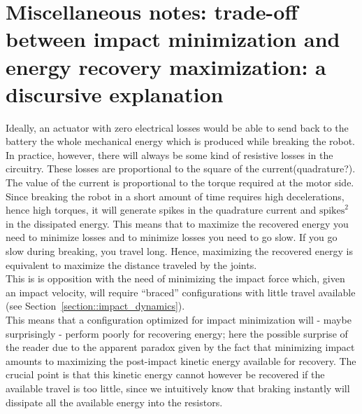 \documentclass[letterpaper, 10 pt, conference]{ieeeconf}  %
\begin{document}
\section{Miscellaneous notes: trade-off between impact minimization and energy recovery maximization: a discursive explanation}\label{section::impact_vs_recovery_tradeoff}
Ideally, an actuator with zero electrical losses would be able to send back to the battery the whole mechanical energy which is produced while breaking the robot. In practice, however, there will always be some kind of resistive losses in the circuitry. These losses are proportional to the square of the current(quadrature?). The value of the current is proportional to the torque required at the motor side. Since breaking the robot in a short amount of time requires high decelerations, hence high torques, it will generate spikes in the quadrature current and $\mathrm{spikes}^2$ in the dissipated energy. This means that to maximize the recovered energy you need to minimize losses and to minimize losses you need to go slow. If you go slow during breaking, you travel long. Hence, maximizing the recovered energy is equivalent to maximize the distance traveled by the joints.\\
This is is opposition with the need of minimizing the impact force which, given an impact velocity, will require \enquote{braced} configurations with little travel available (see Section~\ref{section::impact_dynamics}).\\
This means that a configuration optimized for impact minimization will - maybe surprisingly - perform poorly for recovering energy; here the possible surprise of the reader due to the apparent paradox given by the fact that minimizing impact amounts to maximizing the post-impact kinetic energy available for recovery. The crucial point is that this kinetic energy cannot however be recovered if the available travel is too little, since we intuitively know that braking instantly will dissipate all the available energy into the resistors.
\end{document}
